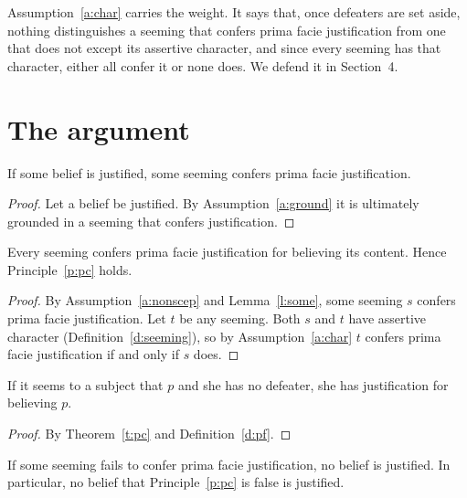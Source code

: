 \documentclass{situationist-preprint}
\begin{document}
Assumption~\ref{a:char} carries the weight. It says that, once defeaters are set aside, nothing distinguishes a seeming that confers prima facie justification from one that does not except its assertive character, and since every seeming has that character, either all confer it or none does. We defend it in Section~4.

\section{The argument}

\begin{lemma}\label{l:some}
If some belief is justified, some seeming confers prima facie justification.
\end{lemma}

\begin{proof}
Let a belief be justified. By Assumption~\ref{a:ground} it is ultimately grounded in a seeming that confers justification.
\end{proof}

\begin{theorem}\label{t:pc}
Every seeming confers prima facie justification for believing its content. Hence Principle~\ref{p:pc} holds.
\end{theorem}

\begin{proof}
By Assumption~\ref{a:nonscep} and Lemma~\ref{l:some}, some seeming $s$ confers prima facie justification. Let $t$ be any seeming. Both $s$ and $t$ have assertive character (Definition~\ref{d:seeming}), so by Assumption~\ref{a:char} $t$ confers prima facie justification if and only if $s$ does.
\end{proof}

\begin{corollary}\label{c:undefeated}
If it seems to a subject that $p$ and she has no defeater, she has justification for believing $p$.
\end{corollary}

\begin{proof}
By Theorem~\ref{t:pc} and Definition~\ref{d:pf}.
\end{proof}

\begin{corollary}\label{c:selfdefeat}
If some seeming fails to confer prima facie justification, no belief is justified. In particular, no belief that Principle~\ref{p:pc} is false is justified.
\end{corollary}
\end{document}
